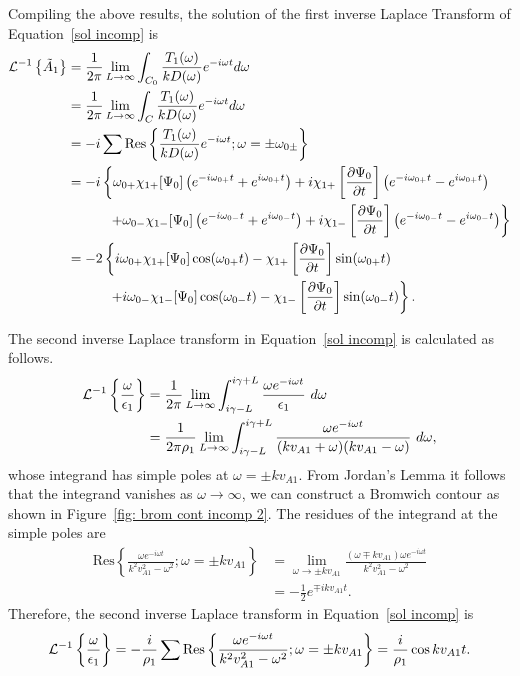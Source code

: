 \documentclass[12pt, draft]{../style-files/ociamthesis}
\begin{document}
Compiling the above results, the solution of the first inverse Laplace Transform of Equation~\eqref{sol incomp} is
\begin{align}
\mathcal{L}^{-1}\left\{ \tilde{A}_1 \right\} &= \frac{1}{2\pi} \lim_{L \to \infty} \int_{C_0} \frac{T_1(\omega)}{kD(\omega)} e^{-i\omega t} d\omega \\
&= \frac{1}{2\pi} \lim_{L \to \infty} \int_{C} \frac{T_1(\omega)}{kD(\omega)} e^{-i\omega t} d\omega \notag \\
&= -i \sum \mathrm{Res}\left\{\frac{T_1(\omega)}{kD(\omega)}e^{-i\omega t}; \omega = \pm \omega_{0\pm} \right\} \notag \\
&= -i \left\{\omega_{0+}\chi_{1+}[\Psi_0] \left(e^{-i\omega_{0+} t} + e^{i\omega_{0+} t}\right) + i\chi_{1+}\left[ \frac{\partial \Psi_0}{\partial t} \right] \left(e^{-i\omega_{0+} t} - e^{i\omega_{0+} t}\right) \right. \notag \\
& \qquad\quad \left. + \omega_{0-}\chi_{1-}[\Psi_0] \left(e^{-i\omega_{0-} t} + e^{i\omega_{0-} t}\right) + i\chi_{1-}\left[ \frac{\partial \Psi_0}{\partial t} \right] \left(e^{-i\omega_{0-} t} - e^{i\omega_{0-} t}\right)\right\} \notag \\
&= -2 \left\{ i\omega_{0+}\chi_{1+}[\Psi_0] \cos(\omega_{0+} t) - \chi_{1+}\left[ \frac{\partial \Psi_0}{\partial t} \right] \sin(\omega_{0+} t) \right. \notag \\
& \qquad\quad \left. + i\omega_{0-}\chi_{1-}[\Psi_0] \cos(\omega_{0-} t) - \chi_{1-}\left[ \frac{\partial \Psi_0}{\partial t} \right] \sin(\omega_{0-} t) \right\}.
\end{align}


The second inverse Laplace transform in Equation~\eqref{sol incomp} is calculated as follows.
\begin{align}
\mathcal{L}^{-1}\left\{ \frac{\omega}{\epsilon_1} \right\} &= \frac{1}{2\pi}\lim_{L \to \infty} \int_{i\gamma - L}^{i\gamma + L} \frac{\omega e^{-i\omega t}}{\epsilon_1} ~d\omega \notag \\
&= \frac{1}{2\pi\rho_1}\lim_{L \to \infty} \int_{i\gamma - L}^{i\gamma + L} \frac{\omega e^{-i\omega t}}{(kv_{A1} + \omega)(kv_{A1} - \omega)} ~d\omega,
\end{align}
whose integrand has simple poles at $\omega = \pm k v_{A1}$. From Jordan's Lemma it follows that the integrand vanishes as $\omega \to \infty$, we can construct a Bromwich contour as shown in Figure~\ref{fig: brom cont incomp 2}. The residues of the integrand at the simple poles are
\begin{align}
\mathrm{Res}\left\{\frac{\omega e^{-i\omega t}}{k^2v_{A1}^2 - \omega^2}; \omega = \pm kv_{A1} \right\} &= 
\lim_{\omega \to \pm kv_{A1}} \frac{(\omega \mp kv_{A1}) \omega e^{-i\omega t}}{k^2v_{A1}^2 - \omega^2} \\ 
&= -\frac{1}{2}e^{\mp ikv_{A1} t}.
\end{align}
Therefore, the second inverse Laplace transform in Equation~\eqref{sol incomp} is
\begin{equation}
\mathcal{L}^{-1}\left\{ \frac{\omega}{\epsilon_1} \right\} = -\frac{i}{\rho_1} \sum \mathrm{Res} \left\{ \frac{\omega e^{-i\omega t}}{k^2v_{A1}^2 - \omega^2}; \omega = \pm kv_{A1} \right\} = \frac{i}{\rho_1}\cos{kv_{A1}t}.
\end{equation}
\end{document}
